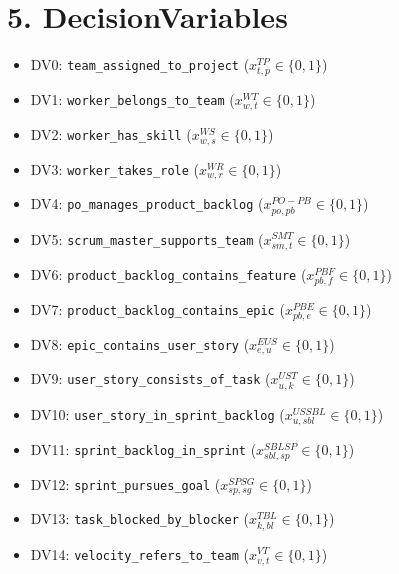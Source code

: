 \documentclass[11pt,a4paper]{article}
\begin{document}
\section{5. DecisionVariables}
\begin{itemize}
  \item DV0: \texttt{team\_assigned\_to\_project} ($x^{TP}_{t,p}\in\{0,1\}$)
  \item DV1: \texttt{worker\_belongs\_to\_team} ($x^{WT}_{w,t}\in\{0,1\}$)
  \item DV2: \texttt{worker\_has\_skill} ($x^{WS}_{w,s}\in\{0,1\}$)
  \item DV3: \texttt{worker\_takes\_role} ($x^{WR}_{w,r}\in\{0,1\}$)
  \item DV4: \texttt{po\_manages\_product\_backlog} ($x^{PO\!-\!PB}_{po,pb}\in\{0,1\}$)
  \item DV5: \texttt{scrum\_master\_supports\_team} ($x^{SMT}_{sm,t}\in\{0,1\}$)
  \item DV6: \texttt{product\_backlog\_contains\_feature} ($x^{PB\!F}_{pb,f}\in\{0,1\}$)
  \item DV7: \texttt{product\_backlog\_contains\_epic} ($x^{PB\!E}_{pb,e}\in\{0,1\}$)
  \item DV8: \texttt{epic\_contains\_user\_story} ($x^{E\!US}_{e,u}\in\{0,1\}$)
  \item DV9: \texttt{user\_story\_consists\_of\_task} ($x^{US\!T}_{u,k}\in\{0,1\}$)
  \item DV10: \texttt{user\_story\_in\_sprint\_backlog} ($x^{US\!SBL}_{u,sbl}\in\{0,1\}$)
  \item DV11: \texttt{sprint\_backlog\_in\_sprint} ($x^{SBL\!SP}_{sbl,sp}\in\{0,1\}$)
  \item DV12: \texttt{sprint\_pursues\_goal} ($x^{SP\!SG}_{sp,sg}\in\{0,1\}$)
  \item DV13: \texttt{task\_blocked\_by\_blocker} ($x^{T\!BL}_{k,bl}\in\{0,1\}$)
  \item DV14: \texttt{velocity\_refers\_to\_team} ($x^{V\!T}_{v,t}\in\{0,1\}$)
\end{itemize}
\end{document}
